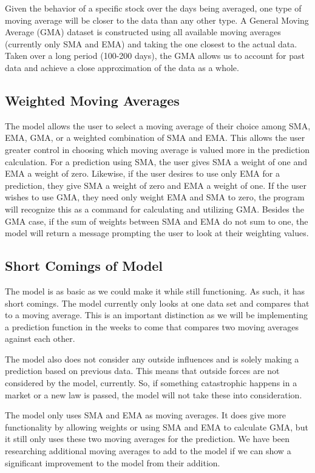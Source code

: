 \documentclass[11pt]{article}
\begin{document}
Given the behavior of a specific stock over the days being averaged, one type of moving average will be closer to the data than any other type. A General Moving Average (GMA) dataset is constructed using all available moving averages (currently only SMA and EMA) and taking the one closest to the actual data. Taken over a long period (100-200 days), the GMA allows us to account for past data and achieve a close approximation of the data as a whole. 

\subsection*{Weighted Moving Averages}\label{WMA}
The model allows the user to select a moving average of their choice among SMA, EMA, GMA, or a weighted combination of SMA and EMA. This allows the user greater control in choosing which moving average is valued more in the prediction calculation. For a prediction using SMA, the user gives SMA a weight of one and EMA a weight of zero. Likewise, if the user desires to use only EMA for a prediction, they give SMA a weight of zero and EMA a weight of one. If the user wishes to use GMA, they need only weight EMA and SMA to zero, the program will recognize this as a command for calculating and utilizing GMA. Besides the GMA case, if the sum of weights between SMA and EMA do not sum to one, the model will return a message prompting the user to look at their weighting values.

\subsection*{Short Comings of Model}\label{SCM}
The model is as basic as we could make it while still functioning. As such, it has short comings. The model currently only looks at one data set and compares that to a moving average. This is an important distinction as we will be implementing a prediction function in the weeks to come that compares two moving averages against each other.

The model also does not consider any outside influences and is solely making a prediction based on previous data. This means that outside forces are not considered by the model, currently. So, if something catastrophic happens in a market or a new law is passed, the model will not take these into consideration.

The model only uses SMA and EMA as moving averages. It does give more functionality by allowing weights or using SMA and EMA to calculate GMA, but it still only uses these two moving averages for the prediction. We have been researching additional moving averages to add to the model if we can show a significant improvement to the model from their addition.
\end{document}
